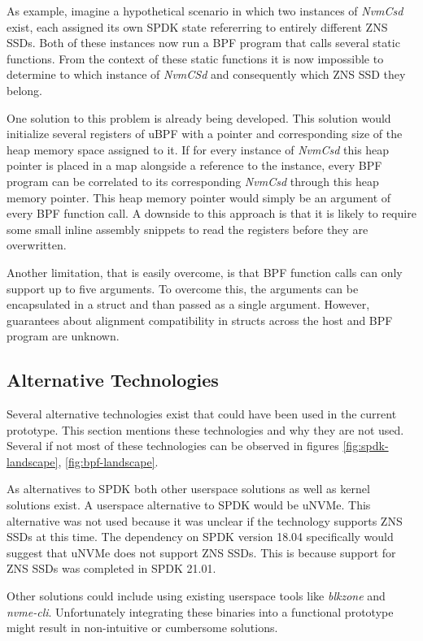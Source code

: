 \documentclass[conference]{IEEEtran}
\begin{document}
As example, imagine a hypothetical scenario in which two instances of
\textit{NvmCsd} exist, each assigned its own SPDK state refererring to entirely
different ZNS SSDs. Both of these instances now run a BPF program that calls
several static functions. From the context of these static functions it is now
impossible to determine to which instance of \textit{NvmCSd} and consequently
which ZNS SSD they belong.

One solution to this problem is already being
developed\cite{ubpf-seed-issue, ubpf-seed-patch}. This solution would initialize
several registers of uBPF with a pointer and corresponding size of the heap
memory space assigned to it. If for every instance of \textit{NvmCsd} this
heap pointer is placed in a map alongside a reference to the instance, every BPF
program can be correlated to its corresponding \textit{NvmCsd} through this
heap memory pointer. This heap memory pointer would simply be an argument
of every BPF function call. A downside to this approach is that it is likely to
require some small inline assembly snippets to read the registers before they
are overwritten.

Another limitation, that is easily overcome, is that BPF function calls can only
support up to five arguments. To overcome this, the arguments can be
encapsulated in a struct and than passed as a single argument. However,
guarantees about alignment compatibility in structs across the host and BPF
program are unknown.

\subsection{Alternative Technologies}

Several alternative technologies exist that could have been used in the current
prototype. This section mentions these technologies and why they are not used.
Several if not most of these technologies can be observed in figures
\ref{fig:spdk-landscape}, \ref{fig:bpf-landscape}.

As alternatives to SPDK both other userspace solutions as well as kernel
solutions exist. A userspace alternative to SPDK would be
uNVMe\cite{unvme-source}. This alternative was not used because it was unclear
if the technology supports ZNS SSDs at this time. The dependency on SPDK version
18.04 specifically would suggest that uNVMe does not support ZNS SSDs. This is
because support for ZNS SSDs was completed in SPDK 21.01\cite{spdk-zns-notes}.

Other solutions could include using existing userspace tools like
\textit{blkzone} and \textit{nvme-cli}. Unfortunately integrating these binaries
into a functional prototype might result in non-intuitive or cumbersome
solutions.
\end{document}
